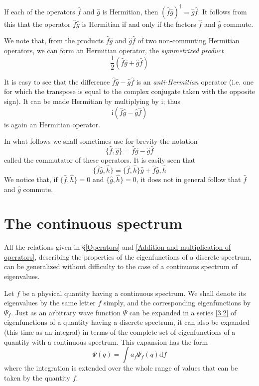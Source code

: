 If each of the operators $ \hat{f} $ and $ \hat{g} $ is Hermitian, then $(\hat{f}\hat{g})^\dag=\hat{g}\hat{f}  $. It follows from this that the operator $ \hat{f}\hat{g} $ is Hermitian if and only if the factors $ \hat{f} $ and $ \hat{g} $ commute.

We note that, from the products $ \hat{f}\hat{g} $ and $ \hat{g}\hat{f} $ of two non-commuting Hermitian operators, we can form an Hermitian operator, the \textit{symmetrized product}
\begin{equation}\label{4.6}
\frac{1}{2}(\hat{f}\hat{g}+\hat{g}\hat{f})
\end{equation}


It is easy to see that the difference $ \hat{f}\hat{g}-\hat{g}\hat{f} $ is an \textit{anti-Hermitian} operator (i.e. one for which the transpose is equal to the complex conjugate taken with the opposite sign). It can be made Hermitian by multiplying by $ \mathrm{i} $; thus
\begin{equation}\label{4.7}
\mathrm{i}(\hat{f}\hat{g}-\hat{g}\hat{f})
\end{equation}
is again an Hermitian operator.

In what follows we shall sometimes use for brevity the notation
\begin{equation}\label{4.8}
\{ \hat{f},\hat{g} \}=\hat{f}\hat{g}-\hat{g}\hat{f}
\end{equation}
called the commutator of these operators. It is easily seen that
\begin{equation}\label{4.9}
\{\hat{f}\hat{g},\hat{h}\}=\{\hat{f},\hat{h}\}\hat{g}+\hat{f}{\hat{g},\hat{h}}
\end{equation}
We notice that, if $ \{\hat{f},\hat{h}\} = 0 $ and $ \{\hat{g},\hat{h}\}=0 $, it does not in general follow that $ \hat{f} $ and $ \hat{g} $ commute.
\section{The continuous spectrum}\label{The continuous spectrum}
All the relations given in §\ref{Operators} and \ref{Addition and multiplication of operators}, describing the properties of the eigenfunctions of a discrete spectrum, can be generalized without difficulty to the case of a continuous spectrum of eigenvalues.
	
Let $ f $ be a physical quantity having a continuous spectrum. We shall denote its eigenvalues by the same letter $ f $ simply, and the corresponding eigenfunctions by $ \Psi_f $. Just as an arbitrary wave function $ \Psi $ can be expanded in a series \eqref{3.2} of eigenfunctions of a quantity having a discrete spectrum, it can also be expanded (this time as an integral) in terms of the complete set of eigenfunctions of a quantity with a continuous spectrum. This expansion has the form
\begin{equation}\label{5.1}
\Psi(q)=\int a_f\Psi_f(q)\mathrm{d}f
\end{equation}
where the integration is extended over the whole range of values that can be taken by the quantity $ f $.
	
